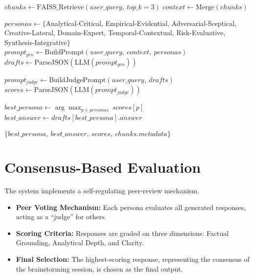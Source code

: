 \begin{algorithm}[H]
\caption{EvoRAG Pipeline --- Query to Consensus Response}
\small
\SetAlgoLined
{}

\BlankLine
{}
$chunks \leftarrow \text{FAISS\_Retrieve}(user\_query,\ top\_k=3)$\;
$context \leftarrow \text{Merge}(chunks)$\;

\BlankLine
{}
$personas \leftarrow \{$Analytical-Critical, Empirical-Evidential, Adversarial-Sceptical,
Creative-Lateral, Domain-Expert, Temporal-Contextual, Risk-Evaluative, Synthesis-Integrative$\}$\;
$prompt_{gen} \leftarrow \text{BuildPrompt}(user\_query,\ context,\ personas)$\;
$drafts \leftarrow \text{ParseJSON}(\text{LLM}(prompt_{gen}))$\;

\BlankLine
{}
$prompt_{judge} \leftarrow \text{BuildJudgePrompt}(user\_query,\ drafts)$\;
$scores \leftarrow \text{ParseJSON}(\text{LLM}(prompt_{judge}))$\;

\BlankLine
{}
$best\_persona \leftarrow \arg\max_{p \in personas}\ scores[p]$\;
$best\_answer \leftarrow drafts[best\_persona].answer$\;

\BlankLine
{}
\Return $\{best\_persona,\ best\_answer,\ scores,\ chunks.metadata\}$\;
\end{algorithm}

\section{Consensus-Based Evaluation}

The system implements a self-regulating peer-review mechanism.

\begin{itemize}
    \item \textbf{Peer Voting Mechanism:} Each persona evaluates all generated responses, acting as a “judge” for others.
    
    \item \textbf{Scoring Criteria:} Responses are graded on three dimensions: Factual Grounding, Analytical Depth, and Clarity.
    
    \item \textbf{Final Selection:} The highest-scoring response, representing the consensus of the brainstorming session, is chosen as the final output.
\end{itemize}


